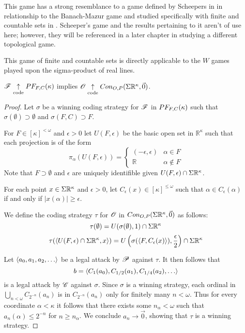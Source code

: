 This game has a strong resemblance to a game defined by Scheepers in
\cite{MR1129143} in relationship to the Banach-Mazur game and studied
specifically with finite and countable sets in \cite{MR1183703}. Scheeper's
game and the results pertaining to it aren't of use here; however, they will be
referenced in a later chapter in studying a different topological game.

This game of finite and countable sets is directly applicable to the $W$
games played upon the sigma-product of real lines.

\begin{lem}
  $\mathscr{F} \underset{\text{code}}{\uparrow} PF_{F,C}(\kappa)$ implies
  $\mathscr{O} \underset{\text{code}}{\uparrow} Con_{O,P}(\Sigma\mathbb{R}^{\kappa},\vec0)$.
\end{lem}

\begin{proof}
  Let $\sigma$ be a winning coding strategy for $\mathscr{F}$ in $PF_{F,C}(\kappa)$
  such that $\sigma(\emptyset)\supset\emptyset$ and $\sigma(F,C)\supset F$.

  For $F\in[\kappa]^{<\omega}$ and $\epsilon>0$ let $U(F,\epsilon)$ be the
  basic open set in $\mathbb{R}^\kappa$ such that each projection is of the form
  \[
    \pi_\alpha(U(F,\epsilon)) =
    \left\{
      \begin{array}{ll}
        (-\epsilon,\epsilon) & \alpha\in F\\
        \mathbb{R} & \alpha\not\in F
      \end{array}
    \right.
  \]
  Note that $F\supset\emptyset$ and $\epsilon$ are uniquely identifible given
  $U(F,\epsilon)\cap\Sigma\mathbb{R}^{\kappa}$.

  For each point $x\in\Sigma\mathbb{R}^{\kappa}$ and $\epsilon> 0$, let
  $C_\epsilon(x)\in[\kappa]^{\leq\omega}$
  such that $\alpha\in C_\epsilon(\alpha)$ if and only if
  $|x(\alpha)|\geq\epsilon$.

  We define the coding strategy $\tau$ for $\mathscr{O}$ in
  $Con_{O,P}(\Sigma\mathbb{R}^{\kappa},\vec0)$ as follows:
  \[
    \tau(\emptyset)
      =
    U(\sigma(\emptyset),1) \cap \Sigma\mathbb{R}^{\kappa}
  \]
  \[
    \tau(\langle U(F,\epsilon)\cap\Sigma\mathbb{R}^{\kappa},x\rangle)
      =
    U\left(\sigma(\langle F,C_{\epsilon}(x)\rangle),\frac{\epsilon}{2}\right)
      \cap
    \Sigma\mathbb{R}^{\kappa}
  \]

  Let $\<a_0,a_1,a_2,\dots\>$ be a legal attack by $\mathscr{P}$ against $\tau$. It
  then follows that
    \[
      b=\<C_{1}(a_0),C_{1/2}(a_1),C_{1/4}(a_2),\dots\>
    \]
  is a
  legal attack by $\mathscr{C}$ against $\sigma$. Since $\sigma$ is a winning
  strategy, each ordinal in $\bigcup_{n<\omega} C_{2^{-n}}(a_n)$ is in
  $C_{2^{-n}}(a_n)$ only for finitely many $n<\omega$. Thus for every coordinate
  $\alpha<\kappa$ it follows that there exists some $n_\alpha<\omega$ such that
  $a_{n}(\alpha)\leq 2^{-n}$ for $n\geq n_\alpha$. We conclude $a_n\to\vec0$,
  showing that $\tau$ is a winning strategy.
\end{proof}

